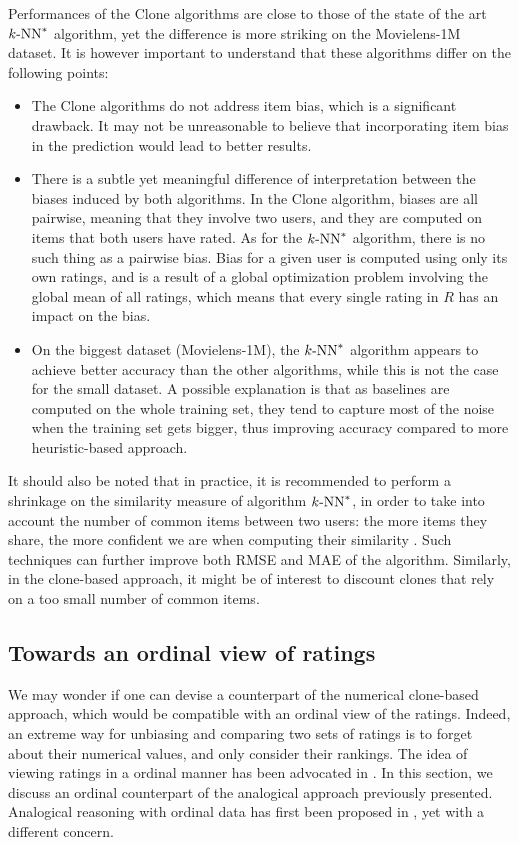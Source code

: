Performances of the Clone algorithms are close to those of the state of the
art $k\text{-NN}^*$ algorithm, yet the difference is more striking on the Movielens-1M
dataset. It is however important to understand that these
algorithms differ on the following points:
\begin{itemize}
\item The Clone algorithms do not address item bias, which is a significant
  drawback. It may not be unreasonable to believe that incorporating item bias
  in the prediction would lead to better results.
\item There is a subtle yet meaningful difference of interpretation between the
  biases induced by both algorithms. In the Clone algorithm, biases are all
  pairwise, meaning that they involve two users, and they are computed on items
  that both users have rated. As for the $k\text{-NN}^*$ algorithm, there is no such
  thing as a pairwise bias. Bias for a given user is computed using only its
  own ratings, and is a result of a global optimization problem involving the
  global mean of all ratings, which means that every single rating in $R$ has
  an impact on the bias.
\item On the biggest dataset (Movielens-1M), the $k\text{-NN}^*$ algorithm appears to
  achieve better accuracy than the other algorithms, while this is not the case
  for the small dataset. A possible explanation is that as baselines are
  computed on the whole training set, they tend to capture most of the noise
  when the training set gets bigger, thus improving accuracy compared to more
  heuristic-based approach.
\end{itemize}

It should also be noted that in practice, it is recommended to perform a
shrinkage on the similarity measure of algorithm $k\text{-NN}^*$, in order to take into
account the number of common items between two users: the more items they
share, the more confident we are when computing their similarity
\cite{KorACM2010}. Such techniques can further improve both RMSE and MAE of the
algorithm.  Similarly, in the clone-based approach, it might be of interest to
discount clones that rely on a too small number of common items.

\subsection{Towards an ordinal view of ratings}
\label{ORDINAL_POV}

We may wonder if one can devise a counterpart of the numerical clone-based
approach, which would be compatible with an ordinal view of the ratings.
Indeed, an extreme way for unbiasing and comparing two sets of ratings is to
forget about their numerical values, and only consider their rankings.  The
idea of viewing ratings in a ordinal manner has been advocated in
\cite{KorSillRECSYS11}.
In this section, we discuss an ordinal counterpart of the analogical approach
previously presented.  Analogical reasoning with ordinal data has first been
proposed in \cite{MicBarCAP09}, yet with a different concern.

